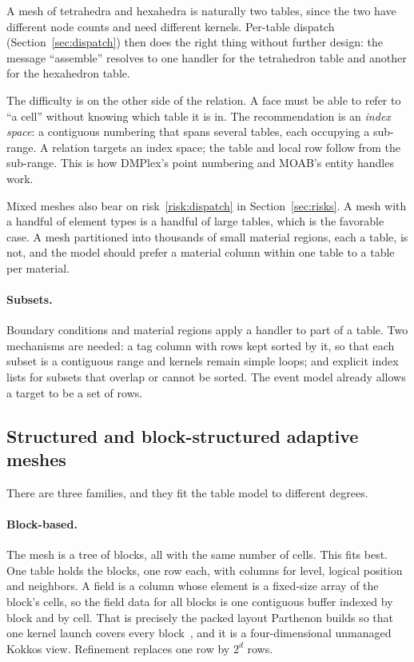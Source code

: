 \documentclass[11pt,a4paper]{article}
\begin{document}
A mesh of tetrahedra and hexahedra is naturally two tables, since the two
have different node counts and need different kernels.  Per-table dispatch
(Section~\ref{sec:dispatch}) then does the right thing without further
design: the message \enquote{assemble} resolves to one handler for the
tetrahedron table and another for the hexahedron table.

The difficulty is on the other side of the relation.  A face must be able to
refer to \enquote{a cell} without knowing which table it is in.  The
recommendation is an \emph{index space}: a contiguous numbering that spans
several tables, each occupying a sub-range.  A relation targets an index
space; the table and local row follow from the sub-range.  This is how
DMPlex's point numbering and MOAB's entity handles work.

Mixed meshes also bear on risk~\ref{risk:dispatch} in Section~\ref{sec:risks}.  A mesh
with a handful of element types is a handful of large tables, which is the
favorable case.  A mesh partitioned into thousands of small material
regions, each a table, is not, and the model should prefer a material column
within one table to a table per material.

\paragraph{Subsets.}  Boundary conditions and material regions apply a
handler to part of a table.  Two mechanisms are needed: a tag column with
rows kept sorted by it, so that each subset is a contiguous range and kernels
remain simple loops; and explicit index lists for subsets that overlap or
cannot be sorted.  The event model already allows a target to be a set of
rows.

\subsection{Structured and block-structured adaptive meshes}

There are three families, and they fit the table model to different degrees.

\paragraph{Block-based.}  The mesh is a tree of blocks, all with the same
number of cells.  This fits best.  One table holds the blocks, one row each,
with columns for level, logical position and neighbors.  A field is a column
whose element is a fixed-size array of the block's cells, so the field data
for all blocks is one contiguous buffer indexed by block and by cell.  That
is precisely the packed layout Parthenon builds so that one kernel launch
covers every block~\cite{parthenon}, and it is a four-dimensional unmanaged
Kokkos view.  Refinement replaces one row by $2^d$ rows.
\end{document}
